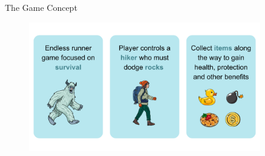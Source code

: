 
\begin{frame}{The Game Concept}
    \begin{figure}
        \includegraphics[width=0.9\textwidth]{../figures/gameBasics.png}
    \end{figure}
\end{frame}
